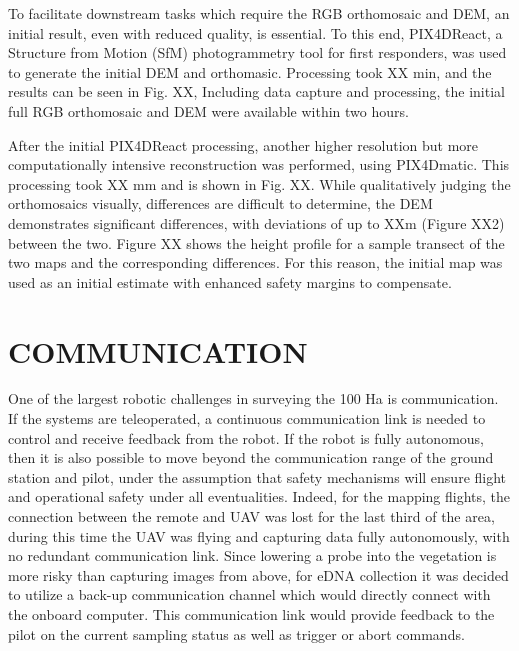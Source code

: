 To facilitate downstream tasks which require the RGB orthomosaic and DEM, an initial result, even with reduced quality, is essential. To this end, PIX4DReact, a Structure from Motion (SfM) photogrammetry tool for first responders, was used to generate the initial DEM and orthomasic. Processing took XX min, and the results can be seen in Fig. XX, Including data capture and processing, the initial full RGB orthomosaic and DEM were available within two hours. 

After the initial PIX4DReact processing, another higher resolution but more computationally intensive reconstruction was performed, using PIX4Dmatic. This processing took XX mm and is shown in Fig. XX.
While qualitatively judging the orthomosaics visually, differences are difficult to determine, the DEM demonstrates significant differences, with deviations of up to XXm (Figure XX2) between the two. Figure XX shows the height profile for a sample transect of the two maps and the corresponding differences. For this reason, the initial map was used as an initial estimate with enhanced safety margins to compensate.
	
	\section{COMMUNICATION}


One of the largest robotic challenges in surveying the 100 Ha is communication. If the systems are teleoperated, a continuous communication link is needed to control and receive feedback from the robot. If the robot is fully autonomous, then it is also possible to move beyond the communication range of the ground station and pilot, under the assumption that safety mechanisms will ensure flight and operational safety under all eventualities.
Indeed, for the mapping flights, the connection between the remote and UAV was lost for the last third of the area, during this time the UAV was flying and capturing data fully autonomously, with no redundant communication link.
Since lowering a probe into the vegetation is more risky than capturing images from above, for eDNA collection it was decided to utilize a back-up communication channel which would directly connect with the onboard computer. This communication link would provide feedback to the pilot on the current sampling status as well as trigger or abort commands.

